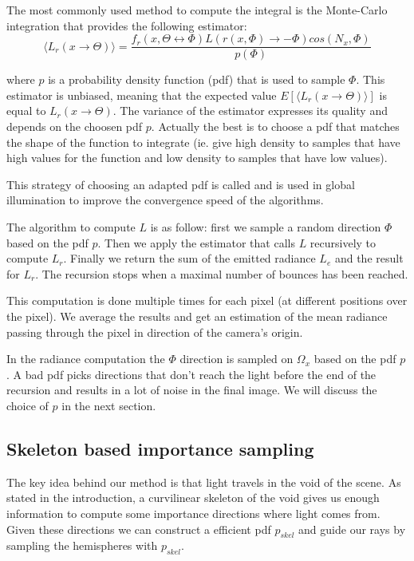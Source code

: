 The most commonly used method to compute the integral is the Monte-Carlo integration that provides the following estimator:
\begin{equation*}
\langle L_r(x \rightarrow \Theta) \rangle = \frac{f_r(x, \Theta \leftrightarrow \Phi) L(r(x, \Phi) \rightarrow -\Phi) cos(N_x, \Phi)}{p(\Phi)}
\end{equation*}

where $p$ is a probability density function (pdf) that is used to sample $\Phi$. This estimator is unbiased, meaning that the expected value $E[\langle L_r(x \rightarrow \Theta) \rangle]$ is equal to $L_r(x \rightarrow \Theta)$. The variance of the estimator expresses its quality and depends on the choosen pdf $p$. Actually the best is to choose a pdf that matches the shape of the function to integrate (ie. give high density to samples that have high values for the function and low density to samples that have low values).

This strategy of choosing an adapted pdf is called  and is used in global illumination to improve the convergence speed of the algorithms.

The algorithm to compute $L$ is as follow: first we sample a random direction $\Phi$ based on the pdf $p$. Then we apply the estimator that calls $L$ recursively to compute $L_r$. Finally we return the sum of the emitted radiance $L_e$ and the result for $L_r$. The recursion stops when a maximal number of bounces has been reached.

This computation is done multiple times for each pixel (at different positions over the pixel). We average the results and get an estimation of the mean radiance passing through the pixel in direction of the camera's origin.

In the radiance computation the $\Phi$ direction is sampled on $\Omega_x$ based on the pdf $p$. A bad pdf picks directions that don't reach the light before the end of the recursion and results in a lot of noise in the final image. We will discuss the choice of $p$ in the next section.

\subsection{Skeleton based importance sampling}

The key idea behind our method is that light travels in the void of the scene. As stated in the introduction, a curvilinear skeleton of the void gives us enough information to compute some importance directions where light comes from. Given these directions we can construct a efficient pdf $p_{skel}$ and guide our rays by sampling the hemispheres with $p_{skel}$.

